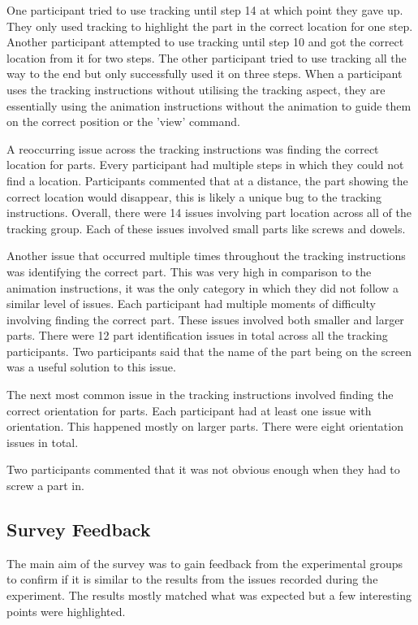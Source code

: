 \documentclass{l4proj}
\begin{document}
One participant tried to use tracking until step 14 at which point they gave up. They only used tracking to highlight the part in the correct location for one step. Another participant attempted to use tracking until step 10 and got the correct location from it for two steps. The other participant tried to use tracking all the way to the end but only successfully used it on three steps. When a participant uses the tracking instructions without utilising the tracking aspect, they are essentially using the animation instructions without the animation to guide them on the correct position or the 'view' command.

A reoccurring issue across the tracking instructions was finding the correct location for parts. Every participant had multiple steps in which they could not find a location. Participants commented that at a distance, the part showing the correct location would disappear, this is likely a unique bug to the tracking instructions. Overall, there were 14 issues involving part location across all of the tracking group. Each of these issues involved small parts like screws and dowels. 

Another issue that occurred multiple times throughout the tracking instructions was identifying the correct part. This was very high in comparison to the animation instructions, it was the only category in which they did not follow a similar level of issues. Each participant had multiple moments of difficulty involving finding the correct part. These issues involved both smaller and larger parts. There were 12 part identification issues in total across all the tracking participants. Two participants said that the name of the part being on the screen was a useful solution to this issue.

The next most common issue in the tracking instructions involved finding the correct orientation for parts. Each participant had at least one issue with orientation. This happened mostly on larger parts. There were eight orientation issues in total.

Two participants commented that it was not obvious enough when they had to screw a part in.

\subsection{Survey Feedback}

The main aim of the survey was to gain feedback from the experimental groups to confirm if it is similar to the results from the issues recorded during the experiment. The results mostly matched what was expected but a few interesting points were highlighted.
\end{document}
